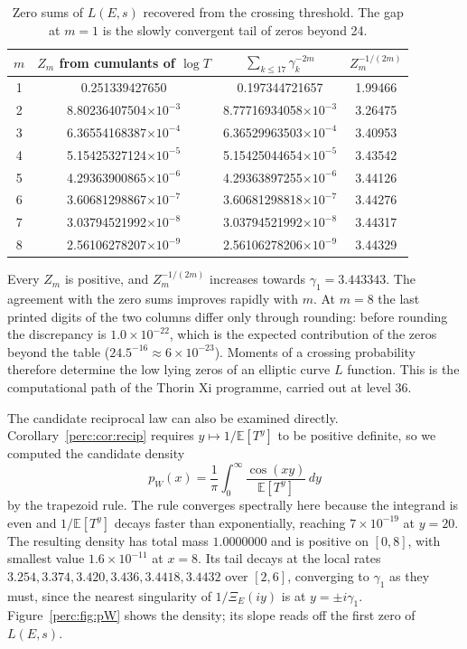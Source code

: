 \begin{table}[h]
\centering
\begin{tabular}{cccc}
\toprule
$m$ & $Z_m$ from cumulants of $\log T$ & $\sum_{k\le17}\gamma_k^{-2m}$ & $Z_m^{-1/(2m)}$ \\
\midrule
1 & 0.251339427650 & 0.197344721657 & 1.99466 \\
2 & 8.80236407504$\times10^{-3}$ & 8.77716934058$\times10^{-3}$ & 3.26475 \\
3 & 6.36554168387$\times10^{-4}$ & 6.36529963503$\times10^{-4}$ & 3.40953 \\
4 & 5.15425327124$\times10^{-5}$ & 5.15425044654$\times10^{-5}$ & 3.43542 \\
5 & 4.29363900865$\times10^{-6}$ & 4.29363897255$\times10^{-6}$ & 3.44126 \\
6 & 3.60681298867$\times10^{-7}$ & 3.60681298818$\times10^{-7}$ & 3.44276 \\
7 & 3.03794521992$\times10^{-8}$ & 3.03794521992$\times10^{-8}$ & 3.44317 \\
8 & 2.56106278207$\times10^{-9}$ & 2.56106278206$\times10^{-9}$ & 3.44329 \\
\bottomrule
\end{tabular}
\caption{Zero sums of $L(E,s)$ recovered from the crossing threshold. The gap at $m = 1$ is the slowly convergent tail of zeros beyond 24.}
\label{perc:tab:Zm}
\end{table}

Every $Z_m$ is positive, and $Z_m^{-1/(2m)}$ increases towards $\gamma_1 = 3.443343$. The agreement with the zero sums improves rapidly with $m$. At $m = 8$ the last printed digits of the two columns differ only through rounding: before rounding the discrepancy is $1.0\times10^{-22}$, which is the expected contribution of the zeros beyond the table ($24.5^{-16}\approx6\times10^{-23}$). Moments of a crossing probability therefore determine the low lying zeros of an elliptic curve $L$ function. This is the computational path of the Thorin Xi programme, carried out at level 36.

The candidate reciprocal law can also be examined directly. Corollary~\ref{perc:cor:recip} requires $y\mapsto1/\mathbb{E}[T^y]$ to be positive definite, so we computed the candidate density
\[
p_W(x) = \frac1\pi\int_0^\infty\frac{\cos(xy)}{\mathbb{E}[T^y]}\,dy
\]
by the trapezoid rule. The rule converges spectrally here because the integrand is even and $1/\mathbb{E}[T^y]$ decays faster than exponentially, reaching $7\times10^{-19}$ at $y = 20$. The resulting density has total mass $1.0000000$ and is positive on $[0,8]$, with smallest value $1.6\times10^{-11}$ at $x = 8$. Its tail decays at the local rates $3.254,3.374,3.420,3.436,3.4418,3.4432$ over $[2,6]$, converging to $\gamma_1$ as they must, since the nearest singularity of $1/\Xi_E(iy)$ is at $y = \pm i\gamma_1$. Figure~\ref{perc:fig:pW} shows the density; its slope reads off the first zero of $L(E,s)$.

